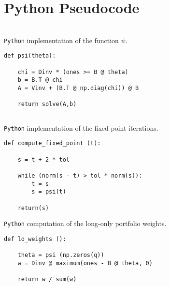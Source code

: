 \documentclass[12pt,leqno,letterpaper]{article}
\begin{document}
\newpage
\appendix


\section{Python Pseudocode} \hspace{1mm} \\
\verb|Python| implementation of the function $\psi$.
\begin{verbatim}
def psi(theta):

    chi = Dinv * (ones >= B @ theta)
    b = B.T @ chi
    A = Vinv + (B.T @ np.diag(chi)) @ B
    
    return solve(A,b)


\end{verbatim}

\verb|Python| implementation of the fixed point iterations.

\begin{verbatim}
def compute_fixed_point (t):

    s = t + 2 * tol

    while (norm(s - t) > tol * norm(s)):
        t = s
        s = psi(t)

    return(s)
\end{verbatim}

\verb|Python| computation of the long-only portfolio weights.

\begin{verbatim}
def lo_weights ():

    theta = psi (np.zeros(q))
    w = Dinv @ maximum(ones - B @ theta, 0) 
    
    return w / sum(w)

\end{verbatim}



\end{document}
